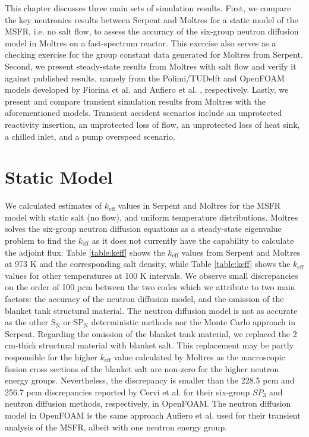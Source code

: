 This chapter discusses three main sets of simulation results. First, we
compare the key neutronics results between Serpent and Moltres for a static
model of the \gls{MSFR}, i.e. no salt flow, to assess the accuracy of the
six-group neutron diffusion model in Moltres on a fast-spectrum reactor. This
exercise also serves as a checking exercise for the group constant data
generated for Moltres from Serpent. Second, we present steady-state results
from Moltres with salt flow and verify it against published results, namely
from the Polimi/TUDelft and OpenFOAM models developed by Fiorina et al.
\cite{fiorina_modelling_2014} and Aufiero et al.
\cite{aufiero_development_2014}, respectively. Lastly, we present and compare
transient simulation results from Moltres with the aforementioned models.
Transient accident scenarios include an unprotected reactivity insertion, an
unprotected loss of flow, an unprotected loss of heat sink, a chilled inlet,
and a pump overspeed scenario.

\section{Static Model}

We calculated estimates of $k_{\text{eff}}$ values in Serpent and Moltres for
the \gls{MSFR} model with static salt (no flow), and uniform temperature
distributions. Moltres solves the six-group neutron diffusion equations as a
steady-state eigenvalue problem to find the $k_{\text{eff}}$ as it does not
currently have the capability to calculate the adjoint flux. Table
\ref{table:keff} shows the $k_{\text{eff}}$ values from Serpent and Moltres at
973 K and the corresponding salt density, while Table \ref{table:keff} shows
the $k_{\text{eff}}$ values for other temperatures at 100 K intervals. We
observe small discrepancies on the order of 100 pcm between the two codes
which we attribute to two main factors: the accuracy of the neutron diffusion
model, and the omission of the blanket tank structural material. The neutron
diffusion model is not as accurate as the other S$_{\text{N}}$ or
SP$_{\text{N}}$ deterministic methods nor the Monte Carlo approach in Serpent.
Regarding the omission of the blanket tank material, we replaced the
2 cm-thick structural material with blanket salt. This replacement may be
partly responsible for the higher $k_{\text{eff}}$ value calculated by Moltres
as the macroscopic fission cross sections of the blanket salt are non-zero for
the higher neutron energy groups. Nevertheless, the discrepancy is smaller
than the 228.5 pcm and 256.7 pcm discrepancies reported by Cervi et al.
\cite{cervi_development_2019} for their six-group $SP_3$ and neutron
diffusion methods, respectively, in OpenFOAM. The neutron diffusion model in
OpenFOAM is the same approach Aufiero et al. \cite{aufiero_development_2014}
used for their transient analysis of the \gls{MSFR}, albeit with one neutron
energy group.

